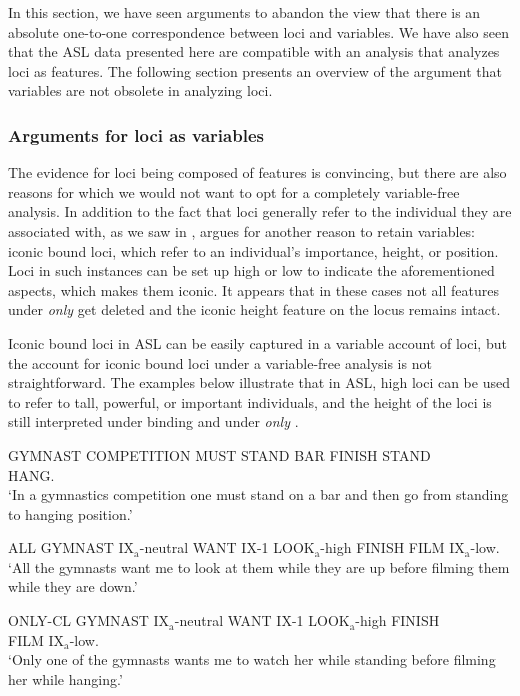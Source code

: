 \documentclass[output=paper,
modfonts
]{langscibook}
\begin{document}
In this section, we have seen arguments to abandon the view that there is an absolute one-to-one correspondence between loci and variables. We have also seen that the ASL data presented here are compatible with an analysis that analyzes loci as features. The following section presents an overview of the argument that variables are not obsolete in analyzing loci. 

\subsubsection{Arguments for loci as variables}

The evidence for loci being composed of features is convincing, but there are also reasons for which we would not want to opt for a completely variable-free analysis. In addition to the fact that loci generally refer to the individual they are associated with, as we saw in , \citet{Schlenker2014} argues for another reason to retain variables: iconic bound loci, which refer to an individual's importance, height, or position. Loci in such instances can be set up high or low to indicate the aforementioned aspects, which makes them iconic. It appears that in these cases not all features under \textit{only} get deleted and the iconic height feature on the locus remains intact. 

Iconic bound loci in ASL can be easily captured in a variable account of loci, but the account for iconic bound loci under a variable-free analysis is not straightforward. The examples below illustrate that in ASL, high loci can be used to refer to tall, powerful, or important individuals, and the height of the loci is still interpreted under binding and under \textit{only} \citep{Schlenker2014}.

\newpage
\begin{exe} 
		\ex GYMNAST COMPETITION MUST STAND BAR FINISH STAND \\ HANG.\\
		`In a gymnastics competition one must stand on a bar and then go from standing to hanging position.'
	\begin{xlist}	
		\ex  ALL GYMNAST IX$_\text{a}$-{neutral} WANT IX-1 LOOK$_\text{a}$-{high} FINISH FILM IX$_\text{a}$-{low}.\\
		`All the gymnasts want me to look at them while they are up before filming them while they are down.'
		
		\ex  ONLY-CL GYMNAST IX$_\text{a}$-{neutral} WANT IX-1 LOOK$_\text{a}$-{high} FINISH \\ FILM IX$_\text{a}$-{low}. \\
		`Only one of the gymnasts wants me to watch her while standing before filming her while hanging.' \citep[1081]{Schlenker2014}
	\end{xlist}     
\end{exe}
\end{document}
